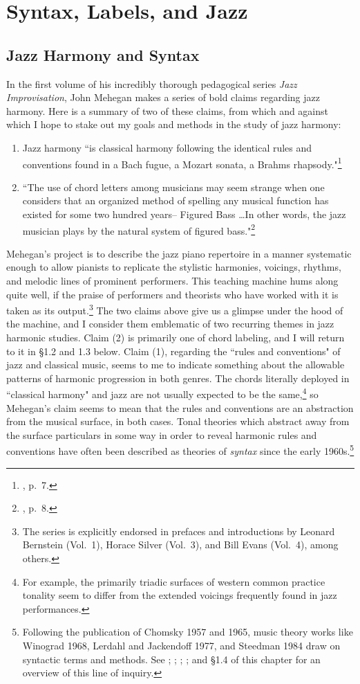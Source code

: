 \chapter{Syntax, Labels, and Jazz}

\section{Jazz Harmony and Syntax}
In the first volume of his incredibly thorough pedagogical series \emph{Jazz Improvisation}, John Mehegan makes a series of bold claims regarding jazz harmony.  Here is a summary of two of these claims, from which and against which I hope to stake out my goals and methods in the study of jazz harmony:
\begin{enumerate}
	\item Jazz harmony ``is classical harmony following the identical rules and conventions found in a Bach fugue, a Mozart sonata, a Brahms rhapsody."\footnote{\cite{mehegan1959}, p.\ 7.}
	\item ``The use of chord letters among musicians may seem strange when one considers that an organized method of spelling any musical function has existed for some two hundred years-- Figured Bass \ldots In other words, the jazz musician plays by the natural system of figured bass."\footnote{\cite{mehegan1959}, p.\ 8.}
\end{enumerate}
Mehegan's project is to describe the jazz piano repertoire in a manner systematic enough to allow pianists to replicate the stylistic harmonies, voicings, rhythms, and melodic lines of prominent performers.  This teaching machine hums along quite well, if the praise of performers and theorists who have worked with it is taken as its output.\footnote{The series is explicitly endorsed in prefaces and introductions by Leonard Bernstein (Vol.\ 1), Horace Silver (Vol.\ 3), and Bill Evans (Vol.\ 4), among others.}  The two claims above give us a glimpse under the hood of the machine, and I consider them emblematic of two recurring themes in jazz harmonic studies.  Claim (2) is primarily one of chord labeling, and I will return to it in \S 1.2 and 1.3 below.  Claim (1), regarding the ``rules and conventions" of jazz and classical music, seems to me to indicate something about the allowable patterns of harmonic progression in both genres.  The chords literally deployed in ``classical harmony" and jazz are not usually expected to be the same,\footnote{For example, the primarily triadic surfaces of western common practice tonality seem to differ from the extended voicings frequently found in jazz performances.} so Mehegan's claim seems to mean that the rules and conventions are an abstraction from the musical surface, in both cases.  Tonal theories which abstract away from the surface particulars in some way in order to reveal harmonic rules and conventions have often been described as theories of \emph{syntax} since the early 1960s.\footnote{Following the publication of Chomsky 1957 and 1965, music theory works like Winograd 1968, Lerdahl and Jackendoff 1977, and Steedman 1984 draw on syntactic terms and methods.  See \cite{chomsky1957}; \cite{winograd1968}; \cite{lj1977}; \cite{steedman1984}; and \S 1.4 of this chapter for an overview of this line of inquiry.}

